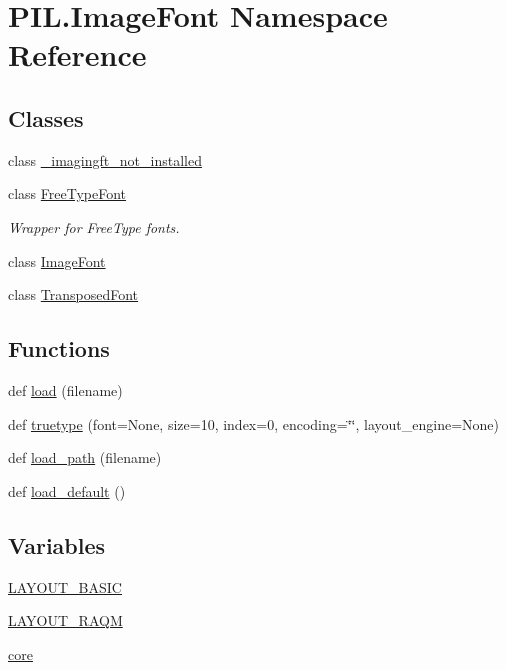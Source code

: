 \hypertarget{namespacePIL_1_1ImageFont}{}\section{P\+I\+L.\+Image\+Font Namespace Reference}
\label{namespacePIL_1_1ImageFont}
\subsection*{Classes}
\begin{DoxyCompactItemize}
\item 
class \hyperlink{classPIL_1_1ImageFont_1_1__imagingft__not__installed}{\+\_\+imagingft\+\_\+not\+\_\+installed}
\item 
class \hyperlink{classPIL_1_1ImageFont_1_1FreeTypeFont}{Free\+Type\+Font}
\begin{DoxyCompactList}\small\item\em Wrapper for Free\+Type fonts. \end{DoxyCompactList}\item 
class \hyperlink{classPIL_1_1ImageFont_1_1ImageFont}{Image\+Font}
\item 
class \hyperlink{classPIL_1_1ImageFont_1_1TransposedFont}{Transposed\+Font}
\end{DoxyCompactItemize}
\subsection*{Functions}
\begin{DoxyCompactItemize}
\item 
def \hyperlink{namespacePIL_1_1ImageFont_adef18079ea6c0d45a068d08604479f9c}{load} (filename)
\item 
def \hyperlink{namespacePIL_1_1ImageFont_aca2b1cbcd4176634d6e190fc97367763}{truetype} (font=None, size=10, index=0, encoding=\char`\"{}\char`\"{}, layout\+\_\+engine=None)
\item 
def \hyperlink{namespacePIL_1_1ImageFont_ad50580641e55bb15562c963d37d4836e}{load\+\_\+path} (filename)
\item 
def \hyperlink{namespacePIL_1_1ImageFont_a57385d8868c8ea8d060d02cfe33c5592}{load\+\_\+default} ()
\end{DoxyCompactItemize}
\subsection*{Variables}
\begin{DoxyCompactItemize}
\item 
\hyperlink{namespacePIL_1_1ImageFont_aa59d127c7e08e982fe790958839b7f67}{L\+A\+Y\+O\+U\+T\+\_\+\+B\+A\+S\+IC}
\item 
\hyperlink{namespacePIL_1_1ImageFont_a5ff9e62415510685abf7bdaf699e0304}{L\+A\+Y\+O\+U\+T\+\_\+\+R\+A\+QM}
\item 
\hyperlink{namespacePIL_1_1ImageFont_a4b0bd817023284079ed4e3955b3b8370}{core}
\end{DoxyCompactItemize}


